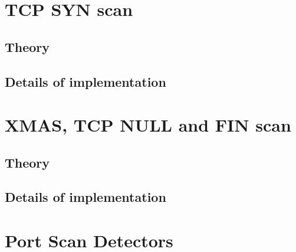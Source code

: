 \documentclass[a4paper]{scrartcl}
\begin{document}
	\section{TCP SYN scan}
	\subsection{Theory}

	
	
	\subsection{Details of implementation}

	
	\section{XMAS, TCP NULL and FIN scan}
		\subsection{Theory}
		
		\subsection{Details of implementation}
		
	\section{Port Scan Detectors}
	
	
	
	\newpage
	\printbibliography
\end{document}
